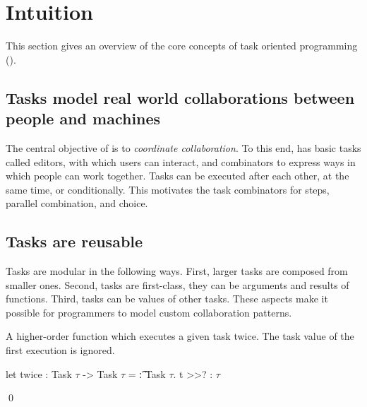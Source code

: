 


\section{Intuition}
\label{sec:intuition}

This section gives an overview of the core concepts of task oriented programming (\TOP).



\subsection{Tasks model real world collaborations between people and machines}

The central objective of \TOP is to \emph{coordinate collaboration}.
To this end, \TOPHAT has basic tasks called editors, with which users can
interact, and combinators to express ways in which people can work together.
Tasks can be executed after each other, at the same time, or
conditionally. This motivates the task combinators for steps, parallel
combination, and choice.



\subsection{Tasks are reusable}

Tasks are modular in the following ways.
First, larger tasks are composed from smaller ones.
Second, tasks are first-class, they can be arguments and results of functions.
Third, tasks can be values of other tasks.
These aspects make it possible for programmers to model custom collaboration patterns.

\begin{example}[Twice]

A higher-order function which executes a given task twice.
The task value of the first execution is ignored.

\begin{TASK}
  let twice : Task $\tau$ -> Task $\tau$ = \t : Task $\tau$. t >>? \x : $\tau$
\end{TASK}
\qed

\end{example}



